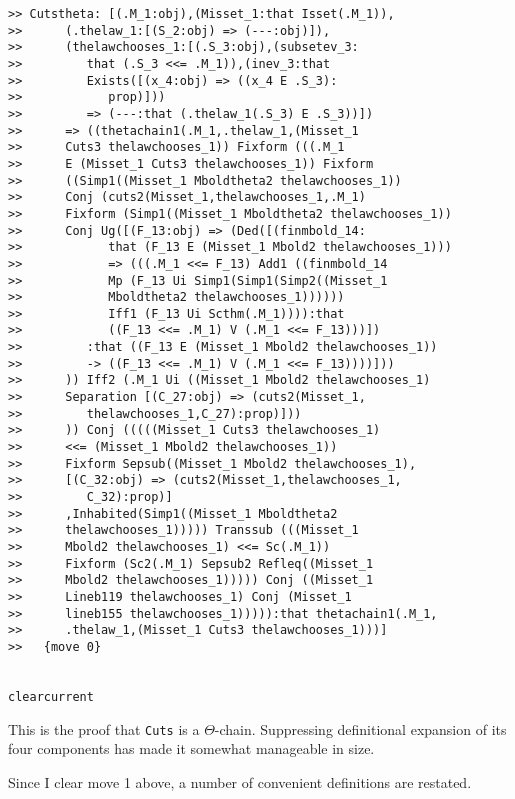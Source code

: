 \documentclass[12pt]{article}
\begin{document}
\begin{verbatim}
>> Cutstheta: [(.M_1:obj),(Misset_1:that Isset(.M_1)),
>>      (.thelaw_1:[(S_2:obj) => (---:obj)]),
>>      (thelawchooses_1:[(.S_3:obj),(subsetev_3:
>>         that (.S_3 <<= .M_1)),(inev_3:that
>>         Exists([(x_4:obj) => ((x_4 E .S_3):
>>            prop)]))
>>         => (---:that (.thelaw_1(.S_3) E .S_3))])
>>      => ((thetachain1(.M_1,.thelaw_1,(Misset_1
>>      Cuts3 thelawchooses_1)) Fixform (((.M_1
>>      E (Misset_1 Cuts3 thelawchooses_1)) Fixform
>>      ((Simp1((Misset_1 Mboldtheta2 thelawchooses_1))
>>      Conj (cuts2(Misset_1,thelawchooses_1,.M_1)
>>      Fixform (Simp1((Misset_1 Mboldtheta2 thelawchooses_1))
>>      Conj Ug([(F_13:obj) => (Ded([(finmbold_14:
>>            that (F_13 E (Misset_1 Mbold2 thelawchooses_1)))
>>            => (((.M_1 <<= F_13) Add1 ((finmbold_14
>>            Mp (F_13 Ui Simp1(Simp1(Simp2((Misset_1
>>            Mboldtheta2 thelawchooses_1))))))
>>            Iff1 (F_13 Ui Scthm(.M_1)))):that
>>            ((F_13 <<= .M_1) V (.M_1 <<= F_13)))])
>>         :that ((F_13 E (Misset_1 Mbold2 thelawchooses_1))
>>         -> ((F_13 <<= .M_1) V (.M_1 <<= F_13))))]))
>>      )) Iff2 (.M_1 Ui ((Misset_1 Mbold2 thelawchooses_1)
>>      Separation [(C_27:obj) => (cuts2(Misset_1,
>>         thelawchooses_1,C_27):prop)]))
>>      )) Conj (((((Misset_1 Cuts3 thelawchooses_1)
>>      <<= (Misset_1 Mbold2 thelawchooses_1))
>>      Fixform Sepsub((Misset_1 Mbold2 thelawchooses_1),
>>      [(C_32:obj) => (cuts2(Misset_1,thelawchooses_1,
>>         C_32):prop)]
>>      ,Inhabited(Simp1((Misset_1 Mboldtheta2
>>      thelawchooses_1))))) Transsub (((Misset_1
>>      Mbold2 thelawchooses_1) <<= Sc(.M_1))
>>      Fixform (Sc2(.M_1) Sepsub2 Refleq((Misset_1
>>      Mbold2 thelawchooses_1))))) Conj ((Misset_1
>>      Lineb119 thelawchooses_1) Conj (Misset_1
>>      lineb155 thelawchooses_1))))):that thetachain1(.M_1,
>>      .thelaw_1,(Misset_1 Cuts3 thelawchooses_1)))]
>>   {move 0}


clearcurrent

\end{verbatim}

This is the proof that {\tt Cuts} is a $\Theta$-chain.  Suppressing definitional expansion of its four components has made it somewhat manageable in size.

Since I clear move 1 above, a number of convenient definitions are restated.
\end{document}
